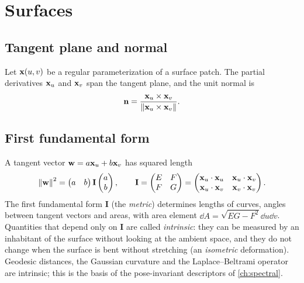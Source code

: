 
\section{Surfaces}

\subsection{Tangent plane and normal}

Let $\mathbf{x}(u,v)$ be a regular parameterization of a surface patch. The partial derivatives $\mathbf{x}_u$
and $\mathbf{x}_v$ span the tangent plane, and the unit normal is
\begin{equation}
\mathbf{n}=\frac{\mathbf{x}_u\times\mathbf{x}_v}{\left\lVert \mathbf{x}_u\times\mathbf{x}_v\right\rVert} .
\end{equation}

\subsection{First fundamental form}

A tangent vector $\mathbf{w}=a\mathbf{x}_u+b\mathbf{x}_v$ has squared length
\begin{equation}
\left\lVert \mathbf{w}\right\rVert^2=\begin{pmatrix}a&b\end{pmatrix}\mathbf{I}\begin{pmatrix}a\\b\end{pmatrix},\qquad
\mathbf{I}=\begin{pmatrix}E&F\\F&G\end{pmatrix}=\begin{pmatrix}\mathbf{x}_u\cdot\mathbf{x}_u&\mathbf{x}_u\cdot\mathbf{x}_v\\
\mathbf{x}_u\cdot\mathbf{x}_v&\mathbf{x}_v\cdot\mathbf{x}_v\end{pmatrix}.
\end{equation}
The first fundamental form $\mathbf I$ (the \emph{metric}) determines lengths of curves, angles
between tangent vectors and areas, with area element $\dd A=\sqrt{EG-F^2}\dd u\dd v$. Quantities
that depend only on $\mathbf I$ are called \emph{intrinsic}: they can be measured by an inhabitant
of the surface without looking at the ambient space, and they do not change when the surface is
bent without stretching (an \emph{isometric} deformation). Geodesic distances, the Gaussian
curvature and the Laplace--Beltrami operator are intrinsic; this is the basis of the
pose-invariant descriptors of \cref{ch:spectral}.

